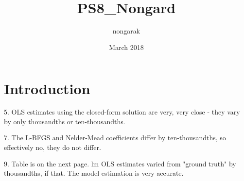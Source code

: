 \documentclass{article}
\title{PS8_Nongard}
\author{nongarak }
\date{March 2018}
\begin{document}
\maketitle

\section{Introduction}

5. 
OLS estimates using the closed-form solution are very, very close - they vary by only thousandths or ten-thousandths. 

7. 
The L-BFGS and Nelder-Mead coefficients differ by ten-thousandths, so effectively no, they do not differ. 

9. 
Table is on the next page. 
lm OLS estimates varied from "ground truth" by thousandths, if that. The model estimation is very accurate.
\end{document}
